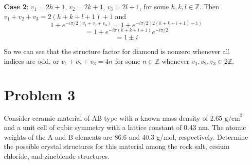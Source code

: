 \documentclass{article}
\begin{document}
\textbf{Case 2}: $v_1 = 2h + 1$, $v_2 = 2k + 1$, $v_3 = 2l + 1$, for some $h,k,l \in \mathbb{Z}$.
\newline
Then $v_1 + v_2 + v_3 = 2(h + k + l + 1) + 1$ and
\[1 + e^{-i\pi/2(v_1 + v_2 + v_3)} = 1 + e^{-i\pi/2(2(h + k + l + 1) + 1)}\]
\[ = 1 + e^{-i\pi(h + k + l + 1)}e^{-i\pi/2}\]
\[ = 1 \pm i\]


So we can see that the structure factor for diamond is nonzero whenever all indices are odd, or $v_1 + v_2 + v_3 = 4n$ for some $n \in \mathbb{Z}$ whenever $v_1,v_2,v_3 \in 2\mathbb{Z}$.

\section*{Problem 3}

Consider ceramic material of AB type with a known mass density of 2.65 $\text{g/cm}^3$ and a unit cell of cubic symmetry with a lattice constant of 0.43 nm. The atomic weights of the A and B elements are 86.6 and 40.3 g/mol, respectively. Determine the possible crystal structures for this material among the rock salt, cesium chloride, and zincblende structures.
\newline
\end{document}
